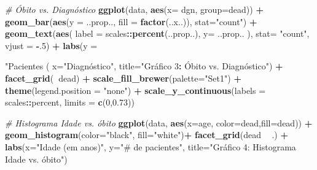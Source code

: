 \documentclass[]{article}
\newenvironment{Shaded}{\begin{snugshade}}{\end{snugshade}}
\newcommand{\KeywordTok}[1]{\textcolor[rgb]{0.13,0.29,0.53}{\textbf{#1}}}
\newcommand{\DataTypeTok}[1]{\textcolor[rgb]{0.13,0.29,0.53}{#1}}
\newcommand{\DecValTok}[1]{\textcolor[rgb]{0.00,0.00,0.81}{#1}}
\newcommand{\FloatTok}[1]{\textcolor[rgb]{0.00,0.00,0.81}{#1}}
\newcommand{\StringTok}[1]{\textcolor[rgb]{0.31,0.60,0.02}{#1}}
\newcommand{\CommentTok}[1]{\textcolor[rgb]{0.56,0.35,0.01}{\textit{#1}}}
\newcommand{\OperatorTok}[1]{\textcolor[rgb]{0.81,0.36,0.00}{\textbf{#1}}}
\newcommand{\NormalTok}[1]{#1}
\begin{document}
\begin{Shaded}
\begin{Highlighting}[]
{\CommentTok{# Óbito vs. Diagnóstico}
\KeywordTok{ggplot}\NormalTok{(data, }\KeywordTok{aes}\NormalTok{(}\DataTypeTok{x=}\NormalTok{ dgn,  }\DataTypeTok{group=}\NormalTok{dead)) }\OperatorTok{+}\StringTok{ }
\StringTok{    }\KeywordTok{geom_bar}\NormalTok{(}\KeywordTok{aes}\NormalTok{(}\DataTypeTok{y =}\NormalTok{ ..prop.., }\DataTypeTok{fill =} \KeywordTok{factor}\NormalTok{(..x..)), }\DataTypeTok{stat=}\StringTok{"count"}\NormalTok{) }\OperatorTok{+}
\StringTok{    }\KeywordTok{geom_text}\NormalTok{(}\KeywordTok{aes}\NormalTok{( }\DataTypeTok{label =}\NormalTok{ scales}\OperatorTok{::}\KeywordTok{percent}\NormalTok{(..prop..),}
                   \DataTypeTok{y=}\NormalTok{ ..prop.. ), }\DataTypeTok{stat=} \StringTok{"count"}\NormalTok{, }\DataTypeTok{vjust =} \OperatorTok{-}\NormalTok{.}\DecValTok{5}\NormalTok{) }\OperatorTok{+}
\StringTok{    }\KeywordTok{labs}\NormalTok{(}\DataTypeTok{y =} \StringTok{"Pacientes (%
         \DataTypeTok{x=}\StringTok{"Diagnóstico",}
\StringTok{         title="}\NormalTok{Gráfico }\DecValTok{3}\OperatorTok{:}\StringTok{ }\NormalTok{Óbito vs. Diagnóstico") }\OperatorTok{+}
\StringTok{    }\KeywordTok{facet_grid}\NormalTok{(}\OperatorTok{~}\NormalTok{dead) }\OperatorTok{+}
\StringTok{    }\KeywordTok{scale_fill_brewer}\NormalTok{(}\DataTypeTok{palette=}\StringTok{"Set1"}\NormalTok{) }\OperatorTok{+}
\StringTok{    }\KeywordTok{theme}\NormalTok{(}\DataTypeTok{legend.position =} \StringTok{"none"}\NormalTok{) }\OperatorTok{+}
\StringTok{    }\KeywordTok{scale_y_continuous}\NormalTok{(}\DataTypeTok{labels =}\NormalTok{ scales}\OperatorTok{::}\NormalTok{percent, }\DataTypeTok{limits =} \KeywordTok{c}\NormalTok{(}\DecValTok{0}\NormalTok{,}\FloatTok{0.73}\NormalTok{))}

\CommentTok{# Histograma Idade vs. óbito}
\KeywordTok{ggplot}\NormalTok{(data, }\KeywordTok{aes}\NormalTok{(}\DataTypeTok{x=}\NormalTok{age,  }\DataTypeTok{color=}\NormalTok{dead,}\DataTypeTok{fill=}\NormalTok{dead)) }\OperatorTok{+}\StringTok{ }
\StringTok{  }\KeywordTok{geom_histogram}\NormalTok{(}\DataTypeTok{color=}\StringTok{"black"}\NormalTok{, }\DataTypeTok{fill=}\StringTok{"white"}\NormalTok{)}\OperatorTok{+}
\StringTok{  }\KeywordTok{facet_grid}\NormalTok{(dead }\OperatorTok{~}\StringTok{ }\NormalTok{.) }\OperatorTok{+}\StringTok{ }
\StringTok{  }\KeywordTok{labs}\NormalTok{(}\DataTypeTok{x=}\StringTok{"Idade (em anos)"}\NormalTok{,}
       \DataTypeTok{y=}\StringTok{"# de pacientes"}\NormalTok{,}
       \DataTypeTok{title=}\StringTok{"Gráfico 4: Histograma Idade vs. óbito"}\NormalTok{)}

}}
\end{Highlighting}
\end{Shaded}
\end{document}
